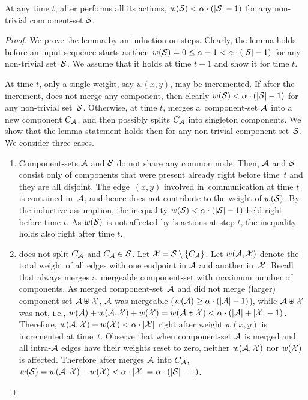 \begin{lemma}
\label{lem:wS_bound}
At any time $t$, after \CREP performs all its actions,
$w(\mathcal{S}) < \alpha \cdot (|\mathcal{S}|-1)$ for any non-trivial component-set $\mathcal{S}$.
\end{lemma}

\begin{proof}
We prove the lemma by an induction on steps. Clearly, the lemma holds before an
input sequence starts as then $w(\mathcal{S}) = 0 \leq \alpha - 1 < \alpha \cdot
(|\mathcal{S}|-1)$ for any non-trivial set~$\mathcal{S}$. We assume that it holds at time $t-1$
and show it for time $t$.

At time $t$, only a single weight, say $w(x,y)$, may be incremented. If after
the increment, \CREP does not merge any component, then clearly $w(\mathcal{S}) < \alpha
\cdot (|\mathcal{S}|-1)$ for any non-trivial set~$\mathcal{S}$. Otherwise, at time $t$, \CREP
merges a~component-set $\mathcal{A}$ into a new component $C_{\mathcal{A}}$, and then possibly
splits $C_{\mathcal{A}}$ into singleton components. We show that
the lemma statement holds then for any non-trivial component-set~$\mathcal{S}$. We
consider three cases.

\begin{enumerate}

\item Component-sets $\mathcal{A}$ and $\mathcal{S}$ do not share any common node. Then, $\mathcal{A}$ and
$\mathcal{S}$ consist only of components that were present already right before time~$t$
and they are all disjoint. The edge~$(x,y)$ involved in~communication at time
$t$ is contained in~$\mathcal{A}$, and hence does not contribute to the weight of
$w(\mathcal{S})$. By the inductive assumption, the inequality 
$w(\mathcal{S}) < \alpha \cdot (|\mathcal{S}|-1)$ held right
before time $t$. As $w(\mathcal{S})$ is not affected by \CREP's actions at step $t$, the
inequality holds also right after time $t$.

\item \CREP does not split $C_{\mathcal{A}}$ and $C_{\mathcal{A}} \in \mathcal{S}$. Let $\mathcal{X} = \mathcal{S} \setminus
\{C_{\mathcal{A}}\}$. Let $w(\mathcal{A},\mathcal{X})$ denote the total weight of all edges with one endpoint
in $\mathcal{A}$ and another in~$\mathcal{X}$. Recall that
\CREP always merges a~mergeable component-set with maximum number of components. 
As \CREP merged component-set~$\mathcal{A}$ and did not merge
(larger) component-set $\mathcal{A} \uplus \mathcal{X}$, $\mathcal{A}$ was mergeable ($w(\mathcal{A}) \geq \alpha \cdot
(|\mathcal{A}|-1)$), while $\mathcal{A} \uplus \mathcal{X}$ was not, i.e., $w(\mathcal{A}) + w(\mathcal{A},\mathcal{X}) + w(\mathcal{X}) = w(\mathcal{A}
\uplus \mathcal{X}) < \alpha \cdot (|\mathcal{A}|+|\mathcal{X}|-1)$. Therefore, $w(\mathcal{A},\mathcal{X}) + w(\mathcal{X}) < \alpha
\cdot |\mathcal{X}|$ right after weight $w(x,y)$ is incremented at time~$t$. Observe
that when component-set $\mathcal{A}$ is merged and all intra-$\mathcal{A}$ edges have their weights 
reset to zero, neither $w(\mathcal{A},\mathcal{X})$ nor $w(\mathcal{X})$ is affected.
Therefore after \CREP merges $\mathcal{A}$ into $C_{\mathcal{A}}$, $w(\mathcal{S}) =
w(\mathcal{A},\mathcal{X}) + w(\mathcal{X}) < \alpha \cdot |\mathcal{X}| = \alpha \cdot (|\mathcal{S}| - 1)$.


\end{enumerate}
\end{proof}
